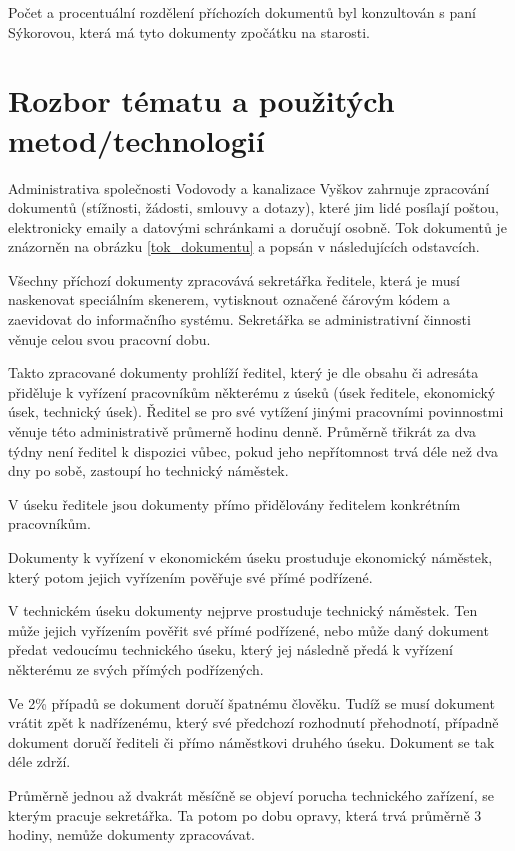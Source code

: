 \documentclass[12pt,a4paper]{article}
\begin{document}
Počet a procentuální rozdělení příchozích dokumentů byl konzultován s paní Sýkorovou, která má tyto dokumenty zpočátku na starosti.

\newpage


\section{Rozbor tématu a použitých metod/technologií}

Administrativa společnosti Vodovody a kanalizace Vyškov zahrnuje zpracování dokumentů (stížnosti, žádosti, smlouvy a dotazy), které jim lidé posílají poštou, elektronicky emaily a datovými schránkami a doručují osobně. Tok dokumentů je znázorněn na obrázku \ref{tok_dokumentu} a popsán v následujících odstavcích.

Všechny příchozí dokumenty zpracovává sekretářka ředitele, která je musí naskenovat speciálním skenerem, vytisknout označené čárovým kódem a zaevidovat do informačního systému. Sekretářka se administrativní činnosti věnuje celou svou pracovní dobu.

Takto zpracované dokumenty prohlíží ředitel, který je dle obsahu či adresáta při\-dě\-lu\-je k vyřízení pracovníkům některému z úseků (úsek ředitele, ekonomický úsek, technický úsek). Ředitel se pro své vytížení jinými pracovními povinnostmi věnuje této administrativě průmerně hodinu denně.
Průměrně třikrát za dva týdny není ředitel k dispozici vůbec, pokud jeho nepřítomnost trvá déle než dva dny po sobě, zastoupí ho technický náměstek.

V úseku ředitele jsou dokumenty přímo přidělovány ředitelem konkrétním pra\-cov\-ní\-kům.

Dokumenty k vyřízení v ekonomickém úseku prostuduje ekonomický náměstek, který potom jejich vyřízením pověřuje své přímé podřízené.

V technickém úseku dokumenty nejprve prostuduje technický náměstek. Ten může jejich vyřízením pověřit své přímé podřízené, nebo může daný dokument předat vedoucímu technického úseku, který jej následně předá k vyřízení některému ze svých přímých podřízených.

Ve 2\% případů se dokument doručí špatnému člověku. Tudíž se musí dokument vrátit zpět k nadřízenému, který své předchozí rozhodnutí přehodnotí, případně dokument doručí řediteli či přímo náměstkovi druhého úseku. Dokument se tak déle zdrží.

Průměrně jednou až dvakrát měsíčně se objeví porucha technického zařízení, se kterým pracuje sekretářka. Ta potom po dobu opravy, která trvá průměrně 3 hodiny, nemůže dokumenty zpracovávat.
\end{document}
